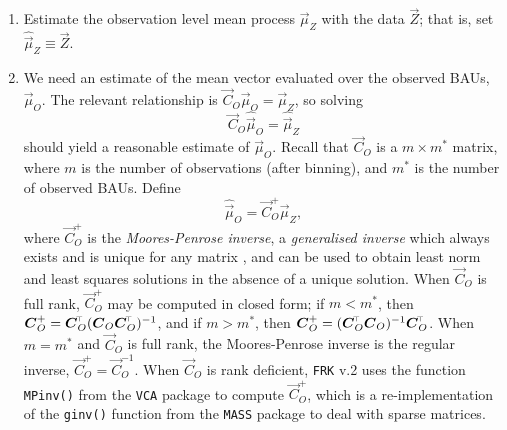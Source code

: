 \documentclass[12pt,a4paper]{article}
\begin{document}
\begin{appendices}
\begin{enumerate}
    \item\label{step_mu_Z} Estimate the observation level mean process $\vec{\mu}_Z$ with the data $\vec{Z}$; that is, set $\hat{\vec{\mu}}_Z \equiv \vec{Z}$. 
    \item We need an estimate of the mean vector evaluated over the observed BAUs, $\vec{\mu}_O$. 
    The relevant relationship is $\vec{C}_O\vec{\mu}_O = \vec{\mu}_Z$, so solving 
    \begin{equation}\label{eqn:C_O_system_to_solve}
        \vec{C}_O\hat{\vec{\mu}}_O = \hat{\vec{\mu}}_Z 
    \end{equation}
    should yield a reasonable estimate of $\vec{\mu}_O$. 
    Recall that $\vec{C}_O$ is a $m \times m^*$ matrix, where $m$ is the number of observations (after binning), and $m^*$ is the number of observed BAUs. 
    Define
    \begin{equation}\label{eqn:MooresPenroseSolution}
        \hat{\vec{\mu}}_O = \vec{C}_O^{+} \vec{\mu}_Z,
    \end{equation}
    where $\vec{C}_O^{+}$ is the \textit{Moores-Penrose inverse}, a \textit{generalised inverse} which always exists and is unique for any matrix \citep[see, e.g., ][Ch.~8]{Searle_1982_MAUFS}, and can be used to obtain least norm and least squares solutions in the absence of a unique solution. 
    When $\vec{C}_O$ is full rank, $\vec{C}_O^{+}$ may be computed in closed form; if $m < m^*$, then $\vec{C}_O^{+} = \vec{C}_O^\tp (\vec{C}_O\vec{C}_O^\tp)^{-1}$, and if $m > m^*$, then $\vec{C}_O^{+} = (\vec{C}_O^\tp\vec{C}_O)^{-1}\vec{C}_O^\tp$. 
    When $m = m^*$ and $\vec{C}_O$ is full rank, the Moores-Penrose inverse is the regular inverse, $\vec{C}_O^{+} = \vec{C}_O^{-1}$. 
    When $\vec{C}_O$ is rank deficient, \texttt{FRK} v.2 uses the function \texttt{MPinv()} from the \texttt{VCA} package to compute $\vec{C}_O^{+}$, which is a re-implementation of the \texttt{ginv()} function from the \texttt{MASS} package to deal with sparse matrices.
    

\end{enumerate}
\end{appendices}
\end{document}
